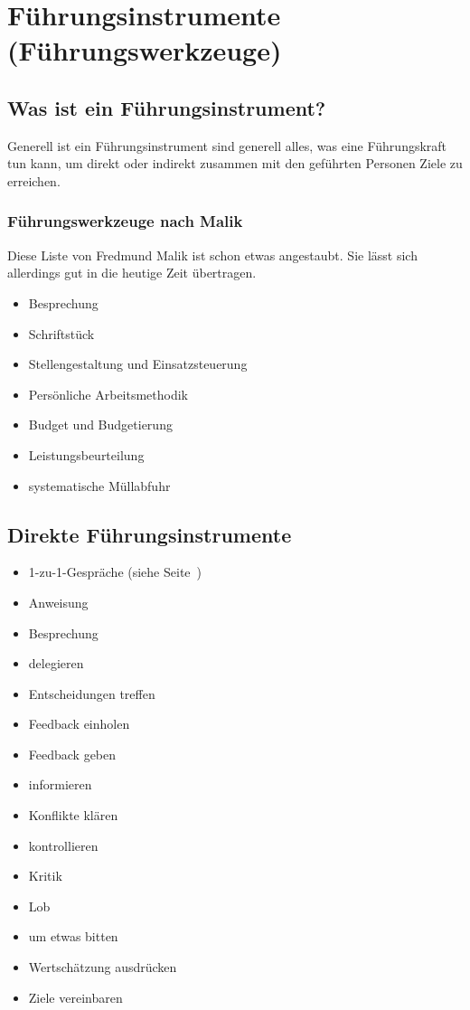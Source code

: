 \section{Führungsinstrumente (Führungswerkzeuge)}
\label{fuehrungsinstrumente}


\subsection{Was ist ein Führungsinstrument?}

Generell ist ein Führungsinstrument sind generell alles, was eine Führungskraft tun kann, um direkt oder indirekt zusammen mit den geführten Personen Ziele zu erreichen.


\subsubsection{Führungswerkzeuge nach Malik}

Diese Liste von Fredmund Malik \cite{malik-fuehrung} ist schon etwas angestaubt. Sie lässt sich allerdings gut in die heutige Zeit übertragen.

\begin{itemize}
  \item Besprechung
  \item Schriftstück
  \item Stellengestaltung und Einsatzsteuerung
  \item Persönliche Arbeitsmethodik
  \item Budget und Budgetierung
  \item Leistungsbeurteilung
  \item systematische Müllabfuhr
\end{itemize}


\subsection{Direkte Führungsinstrumente}

\begin{itemize}
  \item 1-zu-1-Gespräche (siehe Seite~\pageref{1-zu-1})
  \item Anweisung
  \item Besprechung
  \item delegieren
  \item Entscheidungen treffen
  \item Feedback einholen
  \item Feedback geben
  \item informieren
  \item Konflikte klären
  \item kontrollieren
  \item Kritik
  \item Lob
  \item um etwas bitten
  \item Wertschätzung ausdrücken
  \item Ziele vereinbaren
\end{itemize}


